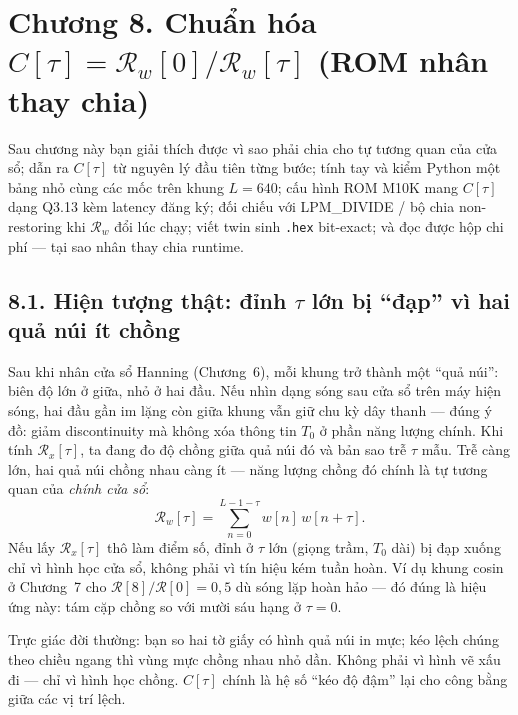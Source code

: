 \clearpage
{}
\section*{Chương 8. Chuẩn hóa $C[\tau]=\mathcal{R}_w[0]/\mathcal{R}_w[\tau]$ (ROM nhân thay chia)}

\begin{learningobj}
Sau chương này bạn giải thích được vì sao phải chia cho tự tương quan của cửa sổ; dẫn ra $C[\tau]$ từ nguyên lý đầu tiên từng bước; tính tay và kiểm Python một bảng nhỏ cùng các mốc trên khung $L=640$; cấu hình ROM M10K mang $C[\tau]$ dạng Q3.13 kèm latency đăng ký; đối chiếu với LPM\_DIVIDE / bộ chia non-restoring khi $\mathcal{R}_w$ đổi lúc chạy; viết twin sinh \texttt{.hex} bit-exact; và đọc được hộp chi phí --- tại sao nhân thay chia runtime.
\end{learningobj}

\subsection*{8.1. Hiện tượng thật: đỉnh $\tau$ lớn bị ``đạp'' vì hai quả núi ít chồng}

Sau khi nhân cửa sổ Hanning (Chương~6), mỗi khung trở thành một ``quả núi'': biên độ lớn ở giữa, nhỏ ở hai đầu. Nếu nhìn dạng sóng sau cửa sổ trên máy hiện sóng, hai đầu gần im lặng còn giữa khung vẫn giữ chu kỳ dây thanh --- đúng ý đồ: giảm discontinuity mà không xóa thông tin $T_0$ ở phần năng lượng chính. Khi tính $\mathcal{R}_x[\tau]$, ta đang đo độ chồng giữa quả núi đó và bản sao trễ $\tau$ mẫu. Trễ càng lớn, hai quả núi chồng nhau càng ít --- năng lượng chồng đó chính là tự tương quan của \emph{chính cửa sổ}:
\[
\mathcal{R}_w[\tau] = \sum_{n=0}^{L-1-\tau} w[n]\, w[n+\tau].
\]
Nếu lấy $\mathcal{R}_x[\tau]$ thô làm điểm số, đỉnh ở $\tau$ lớn (giọng trầm, $T_0$ dài) bị đạp xuống chỉ vì hình học cửa sổ, không phải vì tín hiệu kém tuần hoàn. Ví dụ khung cosin ở Chương~7 cho $\mathcal{R}[8]/\mathcal{R}[0] = 0{,}5$ dù sóng lặp hoàn hảo --- đó đúng là hiệu ứng này: tám cặp chồng so với mười sáu hạng ở $\tau=0$.

Trực giác đời thường: bạn so hai tờ giấy có hình quả núi in mực; kéo lệch chúng theo chiều ngang thì vùng mực chồng nhau nhỏ dần. Không phải vì hình vẽ xấu đi --- chỉ vì hình học chồng. $C[\tau]$ chính là hệ số ``kéo độ đậm'' lại cho công bằng giữa các vị trí lệch.

